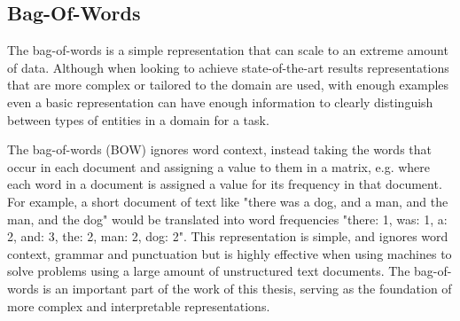 

\subsection{Bag-Of-Words}\label{bg:BOW}

The bag-of-words is a simple representation that can scale to an extreme amount of data. Although when looking to achieve state-of-the-art results representations that are more complex or tailored to the domain are used, with enough examples even a basic representation can have enough information to clearly distinguish between types of entities in a domain for a task. 

The bag-of-words (BOW)  ignores word context, instead taking the words that occur in each document and assigning a value to them in a matrix, e.g. where each word in a document is assigned a value for  its frequency in that document. For example, a short document of text like "there was a dog, and a man, and the man, and the dog" would be translated into word frequencies "there: 1, was: 1, a: 2, and: 3, the: 2, man: 2, dog: 2". This representation is simple, and ignores word context, grammar and punctuation but is highly effective when using machines to solve problems using a large amount of unstructured text documents. The bag-of-words is an important part of the work of this thesis, serving as the foundation of more complex and interpretable representations. 

